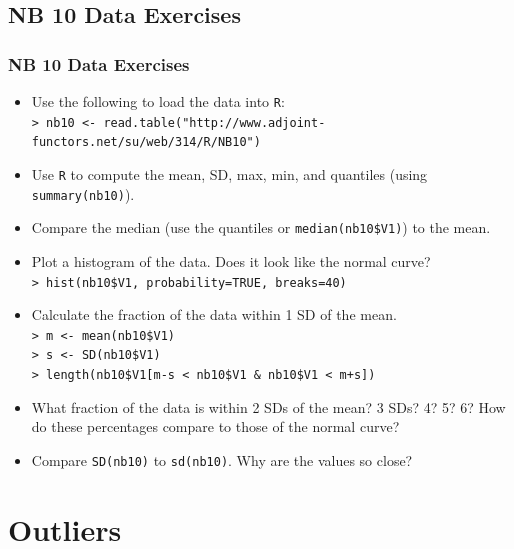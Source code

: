 \documentclass[t]{beamer}
\begin{document}
\subsection{NB 10 Data Exercises}
\begin{frame}[t]\frametitle{NB 10 Data Exercises}
{\small
\begin{itemize}
\item Use the following to load the data into \texttt{R}:\\[2pt]
{\scriptsize  \texttt{> nb10 <- read.table("http://www.adjoint-functors.net/su/web/314/R/NB10")}}
\item  Use \texttt{R} to compute the mean, SD, max, min, and
 quantiles (using \texttt{summary(nb10)}).
\item Compare the median (use the quantiles or
   \texttt{median(nb10\$V1)}) to the mean.
\item Plot a histogram of the data.  
   Does it look like the normal curve?\\[2pt]
    \texttt{> hist(nb10\$V1, probability=TRUE, breaks=40)}
\item Calculate the fraction of the data within 1 SD of the mean.\\
   \texttt{> m <- mean(nb10\$V1)}\\
   \texttt{> s <- SD(nb10\$V1)}\\
   \texttt{> length(nb10\$V1[m-s < nb10\$V1 \&  nb10\$V1 < m+s])}
\item   What fraction of the data is within 2 SDs of the mean?  3 SDs?
   4?  5? 6?
   How do these percentages compare to those of the normal curve?
\item Compare \texttt{SD(nb10)} to \texttt{sd(nb10)}.  Why are 
  the values so close?
\end{itemize}
}
\end{frame}

\section{Outliers}
\end{document}
